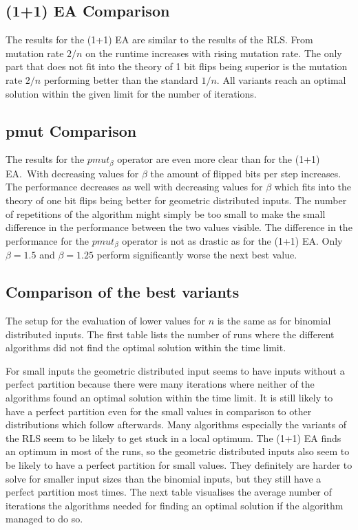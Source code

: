 \subsection{(1+1) EA Comparison}


The results for the (1+1) EA are similar to the results of the RLS. From mutation rate $2/n$ on the runtime increases with rising mutation rate.
The only part that does not fit into the theory of 1 bit flips being superior is the mutation rate $2/n$ performing better than the standard $1/n$.
All variants reach an optimal solution within the given limit for the number of iterations.
\subsection{pmut Comparison}


The results for the $pmut_\beta$ operator are even more clear than for the (1+1) EA.\
With decreasing values for $\beta$ the amount of flipped bits per step increases.
The performance decreases as well with decreasing values for $\beta$ which fits into the theory of one bit flips being better for geometric distributed inputs.
The number of repetitions of the algorithm might simply be too small to make the small difference in the performance between the two values visible.
The difference in the performance for the $pmut_\beta$ operator is not as drastic as for the (1+1) EA.
Only $\beta=1.5$ and $\beta=1.25$ perform significantly worse the next best value.

\subsection{Comparison of the best variants}
% 
% 
The setup for the evaluation of lower values for $n$ is the same as for binomial distributed inputs.
The first table lists the number of runs where the different algorithms did not find the optimal solution within the time limit.



For small inputs the geometric distributed input seems to have inputs without a perfect partition because there were many iterations where neither of the algorithms found an optimal solution within the time limit.
It is still likely to have a perfect partition even for the small values in comparison to other distributions which follow afterwards.
Many algorithms especially the variants of the RLS seem to be likely to get stuck in a local optimum.
The (1+1) EA finds an optimum in most of the runs, so the geometric distributed inputs also seem to be likely to have a perfect partition for small values.
They definitely are harder to solve for smaller input sizes than the binomial inputs, but they still have a perfect partition most times.
The next table visualises the average number of iterations the algorithms needed for finding an optimal solution if the algorithm managed to do so.

